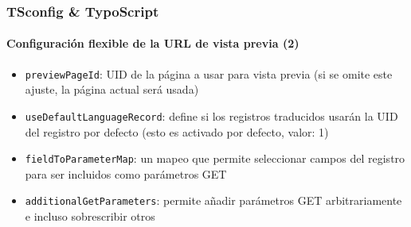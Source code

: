\begin{frame}[fragile]
	\frametitle{TSconfig \& TypoScript}
	\framesubtitle{Configuración flexible de la URL de vista previa (2)}

	\begin{itemize}
		\item \texttt{previewPageId}:\newline
			\smaller
				UID de la página a usar para vista previa\newline
				(si se omite este ajuste, la página actual será usada)
			\normalsize
		\item \texttt{useDefaultLanguageRecord}:\newline
			\smaller
				define si los registros traducidos usarán la UID del registro por defecto\newline
				(esto es activado por defecto, valor: 1)
			\normalsize
		\item \texttt{fieldToParameterMap}:\newline
			\smaller
				un mapeo que permite seleccionar campos del registro para ser incluidos como parámetros GET
			\normalsize
		\item \texttt{additionalGetParameters}:\newline
			\smaller
				permite añadir parámetros GET arbitrariamente e incluso sobrescribir otros
			\normalsize
	\end{itemize}

\end{frame}

